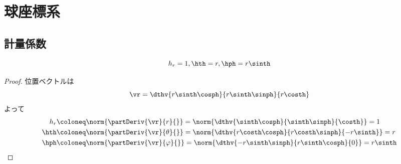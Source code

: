 \chapter{球座標系}
    \section{計量係数}
        \begin{shadebox}
            \[h_r = 1, \hth = r, \hph = r\sinth\]
        \end{shadebox}
        \begin{proof}
            \quad\par
            位置ベクトルは
            \[\vr = \dthv{r\sinth\cosph}{r\sinth\sinph}{r\costh}\]
            よって
            \begin{align*}
                h_r &\coloneq \norm{\partDeriv{\vr}{r}{}} = \norm{\dthv{\sinth\cosph}{\sinth\sinph}{\costh}} = 1\\
                \hth &\coloneq \norm{\partDeriv{\vr}{\theta}{}} = \norm{\dthv{r\costh\cosph}{r\costh\sinph}{-r\sinth}} = r\\
                \hph &\coloneq \norm{\partDeriv{\vr}{\varphi}{}} = \norm{\dthv{-r\sinth\sinph}{r\sinth\cosph}{0}} = r\sinth
            \end{align*}
        \end{proof}
